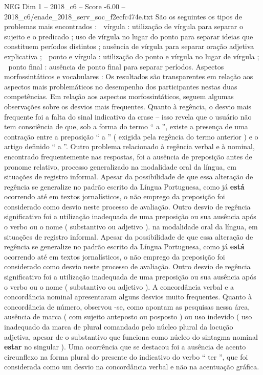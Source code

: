 \begin{textsample}{NEG Dim 1 – 2018\_c6 – Score -6.00 – 2018\_c6/enade\_2018\_serv\_soc\_f2ecfc474e.txt}
São os seguintes os tipos de problemas mais encontrados :  vírgula : utilização de vírgula para separar o sujeito e o predicado ; uso de vírgula no lugar do ponto para separar ideias que constituem períodos distintos ; ausência de vírgula para separar oração adjetiva explicativa ;  ponto e vírgula : utilização do ponto e vírgula no lugar de vírgula ;  ponto final : ausência de ponto final para separar períodos.
Aspectos morfossintáticos e vocabulares : Os resultados são transparentes em relação aos aspectos mais problemáticos no desempenho dos participantes nestas duas competências.
Em relação aos aspectos morfossintáticos, seguem algumas observações sobre os desvios mais frequentes.
Quanto à regência, o desvio mais frequente foi a falta do sinal indicativo da crase – isso revela que o usuário não tem consciência de que, sob a forma do termo “ a ”, existe a presença de uma contração entre a preposição “ a ” ( exigida pela regência do termo anterior ) e o artigo definido “ a ”.
Outro problema relacionado à regência verbal e à nominal, encontrado frequentemente nas respostas, foi a ausência de preposição antes de pronome relativo, processo generalizado na modalidade oral da língua, em situações de registro informal.
Apesar da possibilidade de que essa alteração de regência se generalize no padrão escrito da Língua Portuguesa, como já \textbf{está} ocorrendo até em textos jornalísticos, o não emprego da preposição foi considerado como desvio neste processo de avaliação.
Outro desvio de regência significativo foi a utilização inadequada de uma preposição ou sua ausência após o verbo ou o nome ( substantivo ou adjetivo ). na modalidade oral da língua, em situações de registro informal.
Apesar da possibilidade de que essa alteração de regência se generalize no padrão escrito da Língua Portuguesa, como já \textbf{está} ocorrendo até em textos jornalísticos, o não emprego da preposição foi considerado como desvio neste processo de avaliação.
Outro desvio de regência significativo foi a utilização inadequada de uma preposição ou sua ausência após o verbo ou o nome ( substantivo ou adjetivo ).
A concordância verbal e a concordância nominal apresentaram alguns desvios muito frequentes.
Quanto à concordância de número, observou -se, como apontam as pesquisas nessa área, ausência de marca ( com sujeito anteposto ou posposto ) ou uso indevido ( uso inadequado da marca de plural comandado pelo núcleo plural da locução adjetiva, apesar de o substantivo que funciona como núcleo do sintagma nominal \textbf{estar} no singular ).
Uma ocorrência que se destacou foi a ausência de acento circunflexo na forma plural do presente do indicativo do verbo “ ter ”, que foi considerada como um desvio na concordância verbal e não na acentuação gráfica.

\end{textsample}

